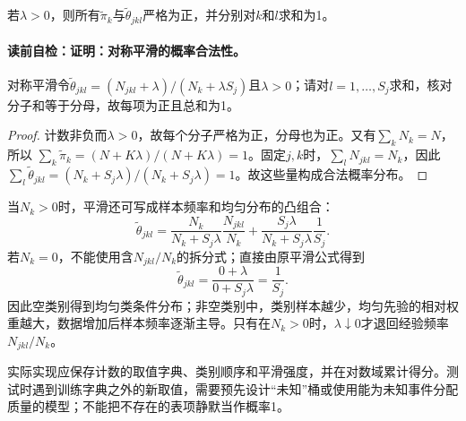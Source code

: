 \begin{theorem}[对称平滑的概率合法性]
若$\lambda>0$，则所有$\widetilde\pi_k$与$\widetilde\theta_{jkl}$严格为正，并分别对$k$和$l$求和为1。
\end{theorem}
\paragraph{读前自检：证明：对称平滑的概率合法性。}对称平滑令$\widetilde\theta_{jkl}=(N_{jkl}+\lambda)/(N_k+\lambda S_j)$且$\lambda>0$；请对$l=1,\ldots,S_j$求和，核对分子和等于分母，故每项为正且总和为1。\par

\begin{proof}
计数非负而$\lambda>0$，故每个分子严格为正，分母也为正。又有$\sum_kN_k=N$，所以
$\sum_k\widetilde\pi_k=(N+K\lambda)/(N+K\lambda)=1$。固定$j,k$时，$\sum_lN_{jkl}=N_k$，因此
$\sum_l\widetilde\theta_{jkl}=(N_k+S_j\lambda)/(N_k+S_j\lambda)=1$。故这些量构成合法概率分布。
\end{proof}

当$N_k>0$时，平滑还可写成样本频率和均匀分布的凸组合：
\[
\widetilde\theta_{jkl}=
\frac{N_k}{N_k+S_j\lambda}\frac{N_{jkl}}{N_k}
+\frac{S_j\lambda}{N_k+S_j\lambda}\frac1{S_j}.
\]
若$N_k=0$，不能使用含$N_{jkl}/N_k$的拆分式；直接由原平滑公式得到
\[
\widetilde\theta_{jkl}
=\frac{0+\lambda}{0+S_j\lambda}
=\frac1{S_j}.
\]
因此空类别得到均匀类条件分布；非空类别中，类别样本越少，均匀先验的相对权重越大，数据增加后样本频率逐渐主导。只有在$N_k>0$时，$\lambda\downarrow0$才退回经验频率$N_{jkl}/N_k$。


实际实现应保存计数的取值字典、类别顺序和平滑强度，并在对数域累计得分。测试时遇到训练字典之外的新取值，需要预先设计“未知”桶或使用能为未知事件分配质量的模型；不能把不存在的表项静默当作概率1。

\label{struct:V2-C03-CH10}
\label{struct:V2-C03-CH19}
\label{struct:V2-C03-CH20}
\label{struct:V2-C03-CH21}
